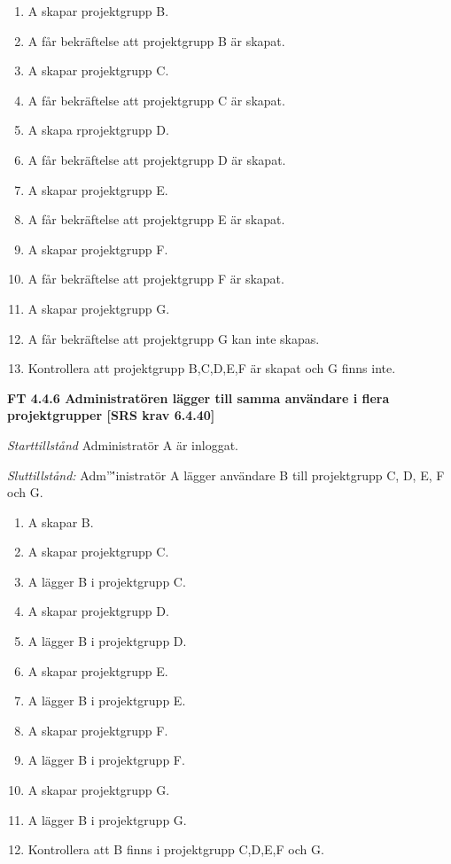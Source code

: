 \documentclass[a4paper]{article}
\begin{document}
\begin{enumerate}
\item A skapar projektgrupp B.
\item A får bekräftelse att projektgrupp B är skapat.
\item A skapar projektgrupp C.
\item A får bekräftelse att projektgrupp C är skapat.
\item A skapa rprojektgrupp D.
\item A får bekräftelse att projektgrupp D är skapat.
\item A skapar projektgrupp E.
\item A får bekräftelse att projektgrupp E är skapat.
\item A skapar projektgrupp F.
\item A får bekräftelse att projektgrupp F är skapat.
\item A skapar projektgrupp G.
\item A får bekräftelse att projektgrupp G kan inte skapas.
\item Kontrollera att projektgrupp B,C,D,E,F är skapat och G finns inte.
\end{enumerate}

\textbf{FT 4.4.6 Administratören lägger till samma användare i flera projektgrupper [SRS krav 6.4.40]}

\emph{Starttillstånd} Administratör A är inloggat.

\emph{Sluttillstånd:} Adm''\''inistratör A lägger användare B till   projektgrupp C, D, E, F och G.

\begin{enumerate}
\item A skapar B.
\item A skapar projektgrupp C.
\item A lägger B i projektgrupp C.
\item A skapar projektgrupp D.
\item A lägger B i projektgrupp D.
\item A skapar projektgrupp E.
\item A lägger B i projektgrupp E.
\item A skapar projektgrupp F.
\item A lägger B i projektgrupp F.
\item A skapar projektgrupp G.
\item A lägger B i projektgrupp G.
\item Kontrollera att B finns i projektgrupp C,D,E,F och G.

\end{enumerate}
\end{document}
